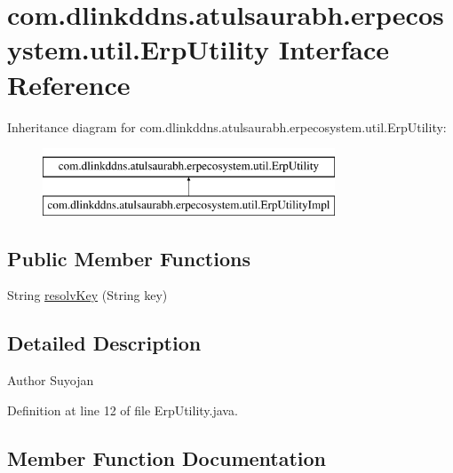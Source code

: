\hypertarget{interfacecom_1_1dlinkddns_1_1atulsaurabh_1_1erpecosystem_1_1util_1_1_erp_utility}{}\section{com.\+dlinkddns.\+atulsaurabh.\+erpecosystem.\+util.\+Erp\+Utility Interface Reference}
\label{interfacecom_1_1dlinkddns_1_1atulsaurabh_1_1erpecosystem_1_1util_1_1_erp_utility}
Inheritance diagram for com.\+dlinkddns.\+atulsaurabh.\+erpecosystem.\+util.\+Erp\+Utility\+:\begin{figure}[H]
\begin{center}
\leavevmode
\includegraphics[height=2.000000cm]{interfacecom_1_1dlinkddns_1_1atulsaurabh_1_1erpecosystem_1_1util_1_1_erp_utility}
\end{center}
\end{figure}
\subsection*{Public Member Functions}
\begin{DoxyCompactItemize}
\item 
String \mbox{\hyperlink{interfacecom_1_1dlinkddns_1_1atulsaurabh_1_1erpecosystem_1_1util_1_1_erp_utility_a177b7a6f2a1ab3a9e620ca914ddcd6d9}{resolv\+Key}} (String key)
\end{DoxyCompactItemize}


\subsection{Detailed Description}
\begin{DoxyAuthor}{Author}
Suyojan 
\end{DoxyAuthor}


Definition at line 12 of file Erp\+Utility.\+java.



\subsection{Member Function Documentation}
\mbox{\label{interfacecom_1_1dlinkddns_1_1atulsaurabh_1_1erpecosystem_1_1util_1_1_erp_utility_a177b7a6f2a1ab3a9e620ca914ddcd6d9}} 
